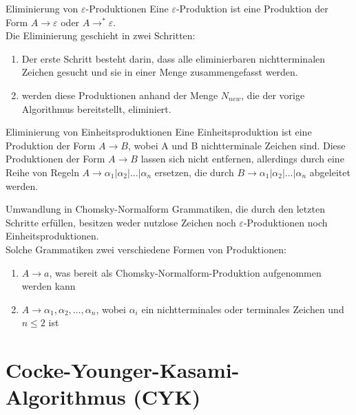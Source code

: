 \documentclass{beamer}
\begin{document}
		\begin{frame}{Eliminierung von $\varepsilon$-Produktionen}
			Eine $\varepsilon$-Produktion ist eine Produktion der Form $A \to \varepsilon$ oder $A \to ^{*} \varepsilon$.\\
			\pause
			Die Eliminierung geschieht in zwei Schritten:
			\pause
			\begin{enumerate}
				\item Der erste Schritt besteht darin, dass alle eliminierbaren nichtterminalen Zeichen gesucht und sie in einer Menge zusammengefasst werden.
				\pause
				\item werden diese Produktionen anhand der Menge $N_{new}$, die der vorige Algorithmus bereitstellt, eliminiert.
			\end{enumerate} 
			
		\end{frame}
		\begin{frame}{Eliminierung von Einheitsproduktionen}
			Eine Einheitsproduktion ist eine Produktion der Form $A \to B$, wobei A und B nichtterminale Zeichen sind.
			\pause
			Diese Produktionen der Form $A \to B$ lassen sich nicht entfernen, allerdings durch eine Reihe von Regeln $A \to \alpha_1|\alpha_2|\ldots|\alpha_n$ ersetzen, die durch $B \to \alpha_1|\alpha_2|\ldots|\alpha_n$ abgeleitet werden.
			
		\end{frame}
		\begin{frame}{Umwandlung in Chomsky-Normalform}
			Grammatiken, die durch den letzten Schritte erfüllen, besitzen weder nutzlose Zeichen noch $\varepsilon$-Produktionen noch Einheitsproduktionen.\\
			\pause
			Solche Grammatiken zwei verschiedene Formen von Produktionen:
			\pause
			\begin{enumerate}
				\item $A \to a$, was bereit als Chomsky-Normalform-Produktion aufgenommen werden kann
				\pause
				\item $A \to \alpha_1, \alpha_2, \ldots ,\alpha_n$, wobei $\alpha_i$ ein nichtterminales oder terminales Zeichen und $n \leq 2$ ist
			\end{enumerate}
		\end{frame}
	
	\section{Cocke-Younger-Kasami-Algorithmus (CYK)}
	
\end{document}
